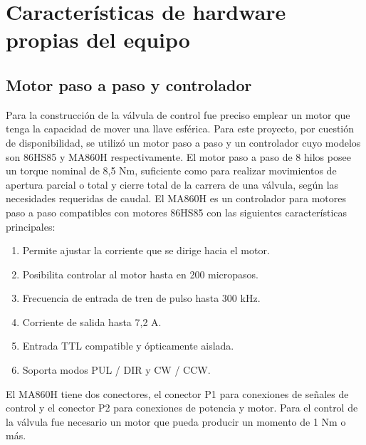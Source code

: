\section{Características de hardware propias del equipo}
\label{sec:Características propias del equipo}
\subsection{Motor paso a paso y controlador}
Para la construcción de la válvula de control fue preciso emplear un motor  que tenga la capacidad de mover una llave esférica. Para este proyecto, por cuestión de disponibilidad, se utilizó un motor paso a paso y un controlador cuyo modelos son 86HS85 y MA860H respectivamente.
El motor paso a paso de 8 hilos posee un torque nominal de 8,5 Nm, suficiente como para realizar movimientos de apertura parcial o total y cierre total de la carrera de una válvula, según las necesidades requeridas de caudal. 
El MA860H \citep{DRIVER}  es un controlador para motores paso a paso compatibles con motores 86HS85 \citep{STEPPERMOTOR} con las siguientes características principales:

\begin{enumerate}
	\item Permite ajustar la corriente que se dirige hacia el motor.
	\item Posibilita controlar al motor hasta en 200 micropasos.
	\item Frecuencia de entrada de tren de pulso hasta 300 kHz. 
	\item Corriente de salida hasta 7,2 A.
	\item Entrada TTL compatible y ópticamente aislada.
	\item Soporta modos PUL / DIR y CW / CCW.
\end{enumerate}

El MA860H tiene dos conectores, el conector P1 para conexiones de señales de control y el conector P2 para conexiones de potencia y motor.     
Para el control de la válvula fue necesario un motor que pueda producir un momento de 1 Nm o más. 

